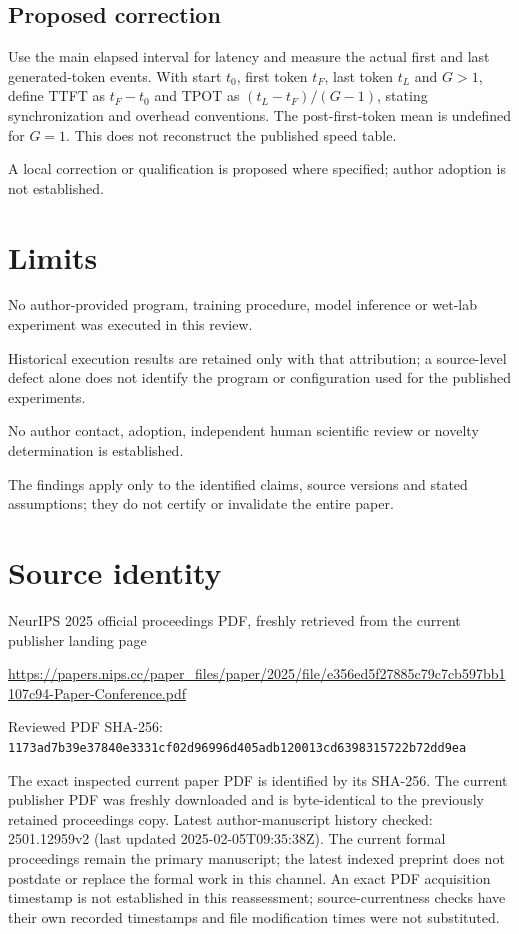 \documentclass[11pt]{article}
\begin{document}
\subsection*{Proposed correction}

Use the main elapsed interval for latency and measure the actual first and last generated-token events. With start \(t_0\), first token \(t_F\), last token \(t_L\) and \(G>1\), define TTFT as \(t_F-t_0\) and TPOT as \((t_L-t_F)/(G-1)\), stating synchronization and overhead conventions. The post-first-token mean is undefined for \(G=1\). This does not reconstruct the published speed table.

A local correction or qualification is proposed where specified; author adoption is not established.

\section*{Limits}

No author-provided program, training procedure, model inference or wet-lab experiment was executed in this review.\par

Historical execution results are retained only with that attribution; a source-level defect alone does not identify the program or configuration used for the published experiments.\par

No author contact, adoption, independent human scientific review or novelty determination is established.\par

The findings apply only to the identified claims, source versions and stated assumptions; they do not certify or invalidate the entire paper.\par

\section*{Source identity}

NeurIPS 2025 official proceedings PDF, freshly retrieved from the current publisher landing page

\url{https://papers.nips.cc/paper_files/paper/2025/file/e356ed5f27885c79c7cb597bb1107c94-Paper-Conference.pdf}

Reviewed PDF SHA-256: \nolinkurl{1173ad7b39e37840e3331cf02d96996d405adb120013cd6398315722b72dd9ea}

The exact inspected current paper PDF is identified by its SHA-256. The current publisher PDF was freshly downloaded and is byte-identical to the previously retained proceedings copy. Latest author-manuscript history checked: 2501.12959v2 (last updated 2025-02-05T09:35:38Z). The current formal proceedings remain the primary manuscript; the latest indexed preprint does not postdate or replace the formal work in this channel.  An exact PDF acquisition timestamp is not established in this reassessment; source-currentness checks have their own recorded timestamps and file modification times were not substituted.
\end{document}
